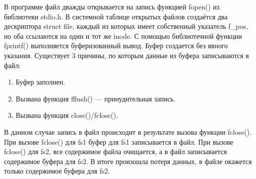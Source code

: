 \documentclass[a4paper,14pt]{extarticle}
\begin{document}
В программе файл дважды открывается на запись функцией fopen() из библиотеки stdio.h. В системной таблице открытых файлов создаётся два дескриптора struct file, каждый из которых имеет собственный указатель f\_pos, но оба ссылаются на один и тот же inode. С помощью библиотечной функции fprintf() выполняется буферизованный вывод. Буфер создается без явного указания. Существует 3 причины, по которым данные из буфера записываются в файл:

\begin{enumerate}[label*=\arabic*.]
	\item Буфер заполнен.
	\item Вызвана функция fflush() --- принудительная запись.
	\item Вызвана функция close()/fclose().
\end{enumerate}

В данном случае запись в файл происходит в результате вызова функции fclose(). При вызове fclose() для fs1 буфер для fs1 записывается в файл. При вызове fclose() для fs2, все содержимое файла очищается, а в файл записывается содержимое буфера для fs2. В итоге произошла потеря данных, в файле окажется только содержимое буфера для fs2.


\end{document}
